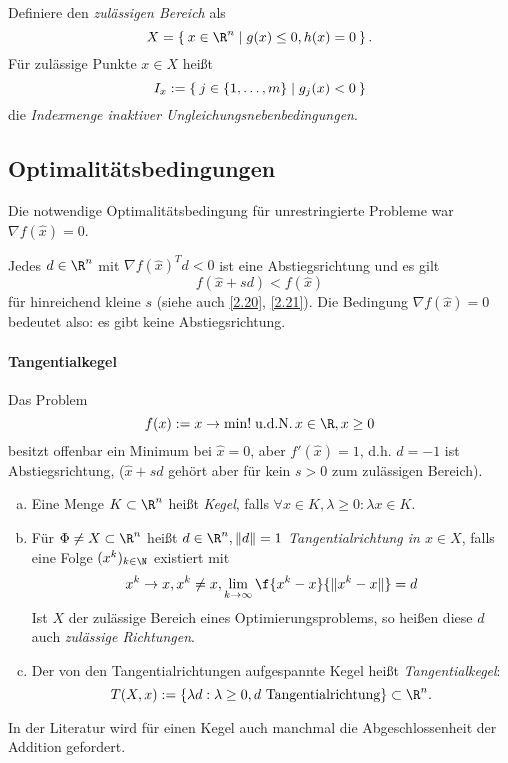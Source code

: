\begin{df} \label{3.11}
	Definiere den \emph{zulässigen Bereich} als
	\[
		X = \Set{ x \in \R^n | g(x) \le 0, h(x) = 0 }.
	\]
	Für zulässige Punkte $x \in X$ heißt
	\[
		I_x := \Set{ j \in \{1, \dotsc, m\} | g_j(x) < 0 }
	\]
	die \emph{Indexmenge inaktiver Ungleichungsnebenbedingungen}.
\end{df}

\subsection{Optimalitätsbedingungen}

Die notwendige Optimalitätsbedingung für unrestringierte Probleme war $\nabla f(\hat x) = 0$.

Jedes $d \in \R^n$ mit $\nabla f(\hat x)^T d < 0$ ist eine Abstiegsrichtung und es gilt
\[
	f(\hat x + sd) < f(\hat x)
\]
für hinreichend kleine $s$ (siehe auch \ref{2.20}, \ref{2.21}).
Die Bedingung $\nabla f(\hat x) = 0$ bedeutet also: es gibt keine Abstiegsrichtung.

\paragraph{Tangentialkegel}

\begin{ex} \label{3.12}
	Das Problem
	\[
		f(x) := x \to \min! \udN  x\in \R, x \ge 0
	\]
	besitzt offenbar ein Minimum bei $\hat x = 0$, aber $f'(\hat x) = 1$, d.h. $d = -1$ ist Abstiegsrichtung, ($\hat x + sd$ gehört aber für kein $s > 0$ zum zulässigen Bereich).
\end{ex}

\begin{df} \label{3.13}
	\begin{enumerate}[(a)]
		\item
			Eine Menge $K \subset \R^n$ heißt \emph{Kegel}, falls $\forall x \in K, \lambda \ge 0 : \lambda x \in K$.
		\item
			Für $\Phi \neq X \subset \R^n$ heißt $d \in \R^n, \|d\| = 1$ \emph{Tangentialrichtung in $x \in X$}, falls eine Folge $(x^k)_{k\in\N}$ existiert mit
			\[
				x^k \to x, x^k \neq x, \lim_{k\to\infty} \f{x^k - x}{\|x^k-x\|} = d
			\]
			Ist $X$ der zulässige Bereich eines Optimierungsproblems, so heißen diese $d$ auch \emph{zulässige Richtungen}.
		\item
			Der von den Tangentialrichtungen aufgespannte Kegel heißt \emph{Tangentialkegel}:
			\[
				T(X, x) := \{ \lambda d : \lambda \ge 0, d \text{ Tangentialrichtung} \} \subset \R^n.
			\]
	\end{enumerate}
	\begin{note}
		In der Literatur wird für einen Kegel auch manchmal die Abgeschlossenheit der Addition gefordert.
	\end{note}
\end{df}


